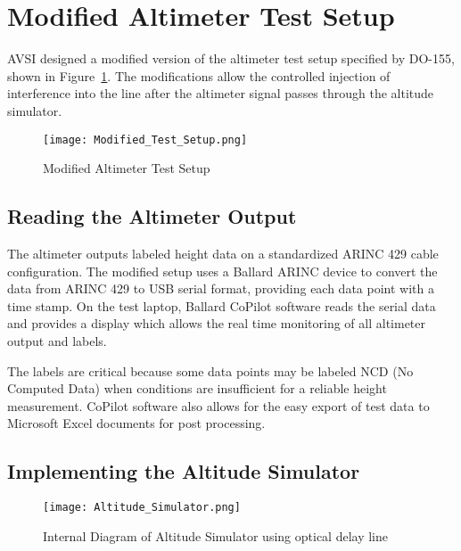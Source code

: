 \section{Modified Altimeter Test Setup} \label{sec:Modified}
AVSI designed a modified version of the altimeter test setup specified by DO-155, shown in Figure~\ref{fig:Modified}. The modifications allow the controlled injection of interference into the line after the altimeter signal passes  through the altitude simulator. 

\begin{figure}[ht]
\centering
\texttt{[image: Modified\_Test\_Setup.png]}
\caption{Modified Altimeter Test Setup}

\label{fig:Modified}

\end{figure}
\subsection{Reading the Altimeter Output}\label{sub:reading_out}
The altimeter outputs labeled height data on a standardized ARINC 429 cable configuration. The modified setup uses a Ballard ARINC device to convert the data from ARINC 429 to USB serial format, providing each data point with a time stamp. On the test laptop, Ballard CoPilot software reads the serial data and provides a display which allows the real time monitoring of all altimeter output and labels. 

The labels are critical because some data points may be labeled NCD (No Computed Data) when conditions are insufficient for a reliable height measurement. CoPilot software also allows for the easy export of test data to Microsoft Excel documents for post processing. 
\subsection{Implementing the Altitude Simulator}\label{sub:Implementing}

\begin{figure}[ht]
\centering
\texttt{[image: Altitude\_Simulator.png]}
\caption{Internal Diagram of Altitude Simulator using optical delay line}

\label{fig:Altitude_Simulator}

\end{figure}

